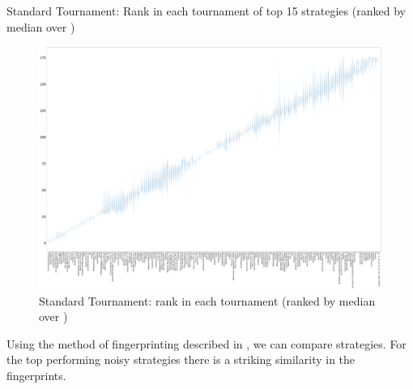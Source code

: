 \documentclass{article}
\begin{document}
\begin{table}[!hbtp]
    \centering
        
        \caption{Standard Tournament: Rank in each tournament
        of top 15 strategies (ranked by median over
        \protecttournaments)}
        \label{tbl:standard_ranks}
\end{table}

\begin{landscape}
    \begin{figure}[!hbtp]
        \centering
        \includegraphics[width=\paperwidth]{./assets/standard_ranks_boxplots.pdf}
        \caption{Standard Tournament: rank in each tournament (ranked by
        median over
        \protecttournaments)}
        \label{fig:standard_ranks_boxplot}
    \end{figure}
\end{landscape}


Using the method of fingerprinting described in \cite{ashlock2008fingerprinting}
\cite{ashlock2009fingerprint}, we can compare
strategies. For the top performing noisy strategies there is a striking similarity
in the fingerprints.
\end{document}
